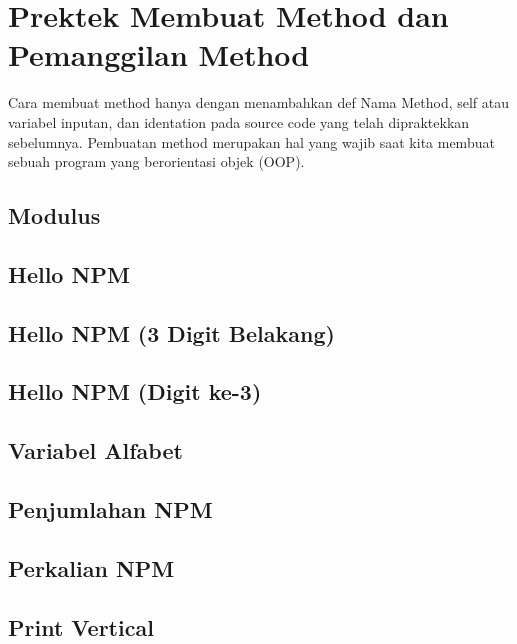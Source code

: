 \section{Prektek Membuat Method dan Pemanggilan Method}
Cara membuat method hanya dengan menambahkan def Nama Method, self atau variabel inputan, dan identation pada source code yang telah dipraktekkan sebelumnya. Pembuatan method merupakan hal yang wajib saat kita membuat sebuah program yang berorientasi objek (OOP).
\subsection{Modulus}

\subsection{Hello NPM}

\subsection{Hello NPM (3 Digit Belakang)}

\subsection{Hello NPM (Digit ke-3)}

\subsection{Variabel Alfabet}

\subsection{Penjumlahan NPM}

\subsection{Perkalian NPM}

\subsection{Print Vertical}

